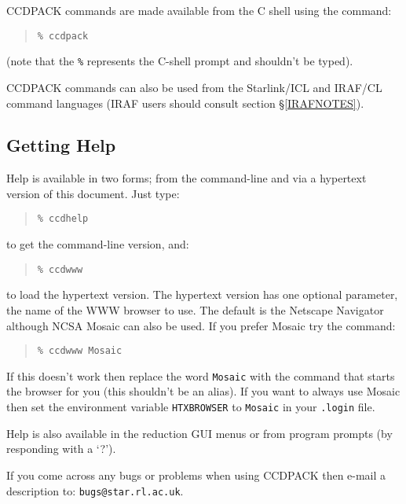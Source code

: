 \documentclass[twoside,11pt]{article}
\newcommand{\htmladdnormallink}[2]{#1}
\newcommand{\xref}[3]{#1}
\newcommand{\xlabel}[1]{}
\renewcommand{\_}{\texttt{\symbol{95}}}
\newenvironment{myquote}{\begin{quote}\begin{small}}{\end{small}\end{quote}}
\newcommand{\text}[1]{{\small \tt #1}}
\begin{document}
CCDPACK commands are made available from the C shell using the command:
\begin{myquote}
\begin{verbatim}
% ccdpack
\end{verbatim}
\end{myquote}
(note that the \text{\%} represents the C-shell prompt and shouldn't be typed).

CCDPACK commands can also be used from the Starlink/\xref{ICL}{sg5}{}
and IRAF/CL command languages (IRAF users should consult section
\S\ref{IRAFNOTES}).

\subsection{\xlabel{gettinghelp}Getting Help}

Help is available in two forms; from the command-line and via a
hypertext version of this document.
Just type:
\begin{myquote}
\begin{verbatim}
% ccdhelp
\end{verbatim}
\end{myquote}
to get the command-line version, and:
\begin{myquote}
\begin{verbatim}
% ccdwww
\end{verbatim}
\end{myquote}
to load the hypertext version. The hypertext version has one optional
parameter, the name of the WWW browser to use. The default is
\htmladdnormallink{the Netscape Navigator}{http://home.netscape.com/}
although
\htmladdnormallink{NCSA Mosaic}
{http://www.ncsa.uiuc.edu/SDG/Software/Mosaic/Docs/help-about.html}
can also be used. If you prefer Mosaic try the command:
\begin{myquote}
\begin{verbatim}
% ccdwww Mosaic
\end{verbatim}
\end{myquote}
If this doesn't work then replace the word \text{Mosaic} with the
command that starts the browser for you (this shouldn't be an alias).
If you want to always use Mosaic then set the environment variable
\text{HTX\_BROWSER} to \text{Mosaic} in your \text{.login} file.

Help is also available in the reduction GUI menus or from program
prompts (by responding with a `?').

If you come across any bugs or problems when using CCDPACK then e-mail
a description to: \texttt{bugs@star.rl.ac.uk}.
\end{document}
